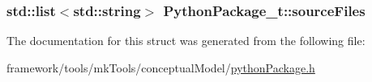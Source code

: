 \subsubsection[{\texorpdfstring{source\+Files}{sourceFiles}}]{\setlength{\rightskip}{0pt plus 5cm}std\+::list$<$std\+::string$>$ Python\+Package\+\_\+t\+::source\+Files}\hypertarget{struct_python_package__t_a64eef6beea9fcc932488bf8bcb89c3ed}{}\label{struct_python_package__t_a64eef6beea9fcc932488bf8bcb89c3ed}


The documentation for this struct was generated from the following file\+:\begin{DoxyCompactItemize}
\item 
framework/tools/mk\+Tools/conceptual\+Model/\hyperlink{python_package_8h}{python\+Package.\+h}\end{DoxyCompactItemize}
